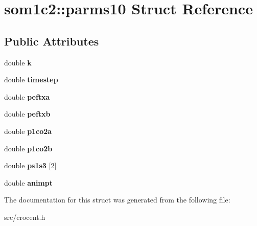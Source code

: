 \hypertarget{structsom1c2_1_1parms10}{\section{som1c2\-:\-:parms10 Struct Reference}
\label{structsom1c2_1_1parms10}
}
\subsection*{Public Attributes}
\begin{DoxyCompactItemize}
\item 
\hypertarget{structsom1c2_1_1parms10_a1fc44743af429b5f1f3754c834be2978}{double {\bfseries k}}\label{structsom1c2_1_1parms10_a1fc44743af429b5f1f3754c834be2978}

\item 
\hypertarget{structsom1c2_1_1parms10_a38797f229165553599f9a0ea75fa37be}{double {\bfseries timestep}}\label{structsom1c2_1_1parms10_a38797f229165553599f9a0ea75fa37be}

\item 
\hypertarget{structsom1c2_1_1parms10_a1b13b1e120af6f1b4f1bf8bbc5e3eaf4}{double {\bfseries peftxa}}\label{structsom1c2_1_1parms10_a1b13b1e120af6f1b4f1bf8bbc5e3eaf4}

\item 
\hypertarget{structsom1c2_1_1parms10_a10256552c127c707cd56f326a502664d}{double {\bfseries peftxb}}\label{structsom1c2_1_1parms10_a10256552c127c707cd56f326a502664d}

\item 
\hypertarget{structsom1c2_1_1parms10_a70f45496548892ae8b725049f08269d0}{double {\bfseries p1co2a}}\label{structsom1c2_1_1parms10_a70f45496548892ae8b725049f08269d0}

\item 
\hypertarget{structsom1c2_1_1parms10_a03295df85f46ed5587ffde98eb796003}{double {\bfseries p1co2b}}\label{structsom1c2_1_1parms10_a03295df85f46ed5587ffde98eb796003}

\item 
\hypertarget{structsom1c2_1_1parms10_af4dc01ce485d3e0c127b2a5a9f972aed}{double {\bfseries ps1s3} \mbox{[}2\mbox{]}}\label{structsom1c2_1_1parms10_af4dc01ce485d3e0c127b2a5a9f972aed}

\item 
\hypertarget{structsom1c2_1_1parms10_a73cbc7faa808112c6cfb11769b2d5879}{double {\bfseries animpt}}\label{structsom1c2_1_1parms10_a73cbc7faa808112c6cfb11769b2d5879}

\end{DoxyCompactItemize}


The documentation for this struct was generated from the following file\-:\begin{DoxyCompactItemize}
\item 
src/crocent.\-h\end{DoxyCompactItemize}
